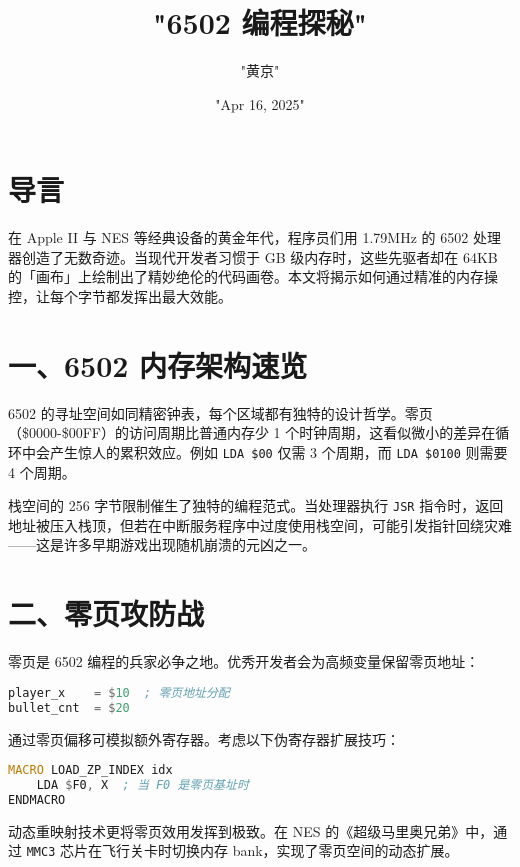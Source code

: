 \title{"6502 编程探秘"}
\author{"黄京"}
\date{"Apr 16, 2025"}
\maketitle
\chapter{导言}
在 Apple II 与 NES 等经典设备的黄金年代，程序员们用 1.79MHz 的 6502 处理器创造了无数奇迹。当现代开发者习惯于 GB 级内存时，这些先驱者却在 64KB 的「画布」上绘制出了精妙绝伦的代码画卷。本文将揭示如何通过精准的内存操控，让每个字节都发挥出最大效能。\par
\chapter{一、6502 内存架构速览}
6502 的寻址空间如同精密钟表，每个区域都有独特的设计哲学。零页（\${}0000-\${}00FF）的访问周期比普通内存少 1 个时钟周期，这看似微小的差异在循环中会产生惊人的累积效应。例如 \verb!LDA $00! 仅需 3 个周期，而 \verb!LDA $0100! 则需要 4 个周期。\par
栈空间的 256 字节限制催生了独特的编程范式。当处理器执行 \verb!JSR! 指令时，返回地址被压入栈顶，但若在中断服务程序中过度使用栈空间，可能引发指针回绕灾难——这是许多早期游戏出现随机崩溃的元凶之一。\par
\chapter{二、零页攻防战}
零页是 6502 编程的兵家必争之地。优秀开发者会为高频变量保留零页地址：\par
\begin{lstlisting}[language=asm]
player_x    = $10  ; 零页地址分配
bullet_cnt  = $20
\end{lstlisting}
通过零页偏移可模拟额外寄存器。考虑以下伪寄存器扩展技巧：\par
\begin{lstlisting}[language=asm]
MACRO LOAD_ZP_INDEX idx
    LDA $F0, X  ; 当 F0 是零页基址时
ENDMACRO
\end{lstlisting}
动态重映射技术更将零页效用发挥到极致。在 NES 的《超级马里奥兄弟》中，通过 \verb!MMC3! 芯片在飞行关卡时切换内存 bank，实现了零页空间的动态扩展。\par
